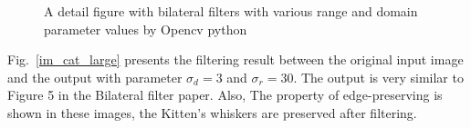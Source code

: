 \documentclass[12pt]{article}
\begin{document}
\begin{figure}[H]
  \quad
  \quad
  \quad
  \caption{A detail figure with bilateral filters with various range and domain parameter values by Opencv python}
  \label{py_cateye}
  \end{figure}

Fig.~\ref{im_cat_large} presents the filtering result between the original input image and the output with parameter $\sigma_d = 3$ and $\sigma_r = 30$. 
The output is very similar to Figure 5 in the Bilateral filter paper.
Also,  The property of edge-preserving is shown in these images, the Kitten's whiskers are preserved after filtering.
\end{document}
